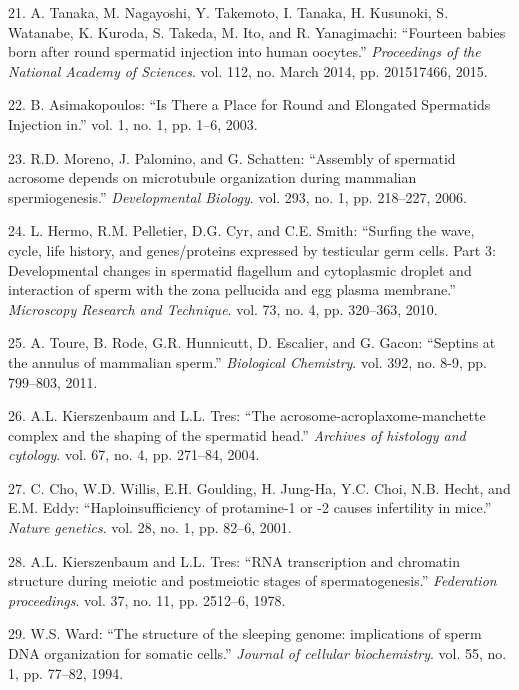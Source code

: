 \documentclass[12pt,a4paper,twoside]{ugathesis}
\theoremstyle{definition}
\theoremstyle{definition}
\theoremstyle{definition}
\theoremstyle{remark}
\begin{document}
\hypertarget{ref-Tanaka2015}{}
21. A. Tanaka, M. Nagayoshi, Y. Takemoto, I. Tanaka, H. Kusunoki, S.
Watanabe, K. Kuroda, S. Takeda, M. Ito, and R. Yanagimachi: ``Fourteen
babies born after round spermatid injection into human oocytes.''
\emph{Proceedings of the National Academy of Sciences}. vol. 112, no.
March 2014, pp. 201517466, 2015.

\hypertarget{ref-Asimakopoulos2003}{}
22. B. Asimakopoulos: ``Is There a Place for Round and Elongated
Spermatids Injection in.'' vol. 1, no. 1, pp. 1--6, 2003.

\hypertarget{ref-Moreno2006}{}
23. R.D. Moreno, J. Palomino, and G. Schatten: ``Assembly of spermatid
acrosome depends on microtubule organization during mammalian
spermiogenesis.'' \emph{Developmental Biology}. vol. 293, no. 1, pp.
218--227, 2006.

\hypertarget{ref-Hermo2010}{}
24. L. Hermo, R.M. Pelletier, D.G. Cyr, and C.E. Smith: ``Surfing the
wave, cycle, life history, and genes/proteins expressed by testicular
germ cells. Part 3: Developmental changes in spermatid flagellum and
cytoplasmic droplet and interaction of sperm with the zona pellucida and
egg plasma membrane.'' \emph{Microscopy Research and Technique}. vol.
73, no. 4, pp. 320--363, 2010.

\hypertarget{ref-Toure2011}{}
25. A. Toure, B. Rode, G.R. Hunnicutt, D. Escalier, and G. Gacon:
``Septins at the annulus of mammalian sperm.'' \emph{Biological
Chemistry}. vol. 392, no. 8-9, pp. 799--803, 2011.

\hypertarget{ref-Kierszenbaum2004}{}
26. A.L. Kierszenbaum and L.L. Tres: ``The
acrosome-acroplaxome-manchette complex and the shaping of the spermatid
head.'' \emph{Archives of histology and cytology}. vol. 67, no. 4, pp.
271--84, 2004.

\hypertarget{ref-Cho2001}{}
27. C. Cho, W.D. Willis, E.H. Goulding, H. Jung-Ha, Y.C. Choi, N.B.
Hecht, and E.M. Eddy: ``Haploinsufficiency of protamine-1 or -2 causes
infertility in mice.'' \emph{Nature genetics}. vol. 28, no. 1, pp.
82--6, 2001.

\hypertarget{ref-Kierszenbaum1978}{}
28. A.L. Kierszenbaum and L.L. Tres: ``RNA transcription and chromatin
structure during meiotic and postmeiotic stages of spermatogenesis.''
\emph{Federation proceedings}. vol. 37, no. 11, pp. 2512--6, 1978.

\hypertarget{ref-Ward1994}{}
29. W.S. Ward: ``The structure of the sleeping genome: implications of
sperm DNA organization for somatic cells.'' \emph{Journal of cellular
biochemistry}. vol. 55, no. 1, pp. 77--82, 1994.
\end{document}
